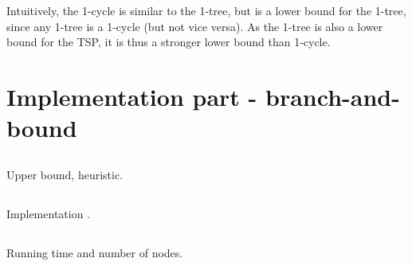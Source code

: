 \documentclass[11pt,a4paper,english]{article}
\begin{document}
Intuitively, the 1-cycle is similar to the 1-tree, but is a lower bound for the 1-tree, since any 1-tree is a 1-cycle (but not vice versa). As the 1-tree is also a lower bound for the TSP, it is thus a stronger lower bound than 1-cycle.
\clearpage

\section{Implementation part - branch-and-bound}

\subsection{}
Upper bound, heuristic.

\subsection{}
Implementation \citep{Wolsey}.

\subsection{}
Running time and number of nodes.

\clearpage


\end{document}
